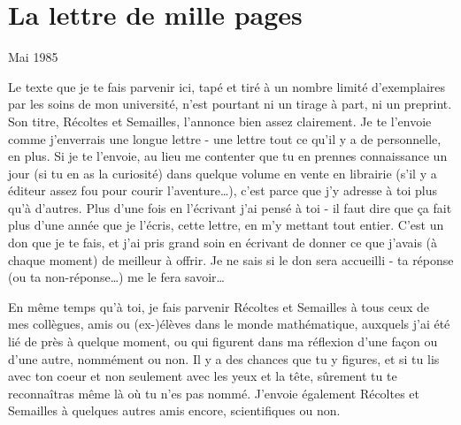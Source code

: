 \section{La lettre de mille pages}

Mai 1985

Le texte que je te fais parvenir ici, tapé et tiré à un nombre limité d'exemplaires par les soins de mon université, n'est pourtant ni un tirage à part, ni un preprint. Son titre, Récoltes et Semailles, l'annonce bien assez clairement. Je te l'envoie comme j'enverrais une longue lettre - une lettre tout ce qu'il y a de personnelle, en plus. Si je te l'envoie, au lieu me contenter que tu en prennes connaissance un jour (si tu en as la curiosité) dans quelque volume en vente en librairie (s'il y a éditeur assez fou pour courir l'aventure\ldots), c'est parce que j'y adresse à toi plus qu'à d'autres. Plus d'une fois en l'écrivant j'ai pensé à toi - il faut dire que ça fait plus d'une année que je l'écris, cette lettre, en m'y mettant tout entier. C'est un don que je te fais, et j'ai pris grand soin en écrivant de donner ce que j'avais (à chaque moment) de meilleur à offrir. Je ne sais si le don sera accueilli - ta réponse (ou ta non-réponse\ldots) me le fera savoir\ldots

En même temps qu'à toi, je fais parvenir Récoltes et Semailles à tous ceux de mes collègues, amis ou (ex-)élèves dans le monde mathématique, auxquels j'ai été lié de près à quelque moment, ou qui figurent dans ma réflexion d'une façon ou d'une autre, nommément ou non. Il y a des chances que tu y figures, et si tu lis avec ton coeur et non seulement avec les yeux et la tête, sûrement tu te reconnaîtras même là où tu n'es pas nommé. J'envoie également Récoltes et Semailles à quelques autres amis encore, scientifiques ou non.

